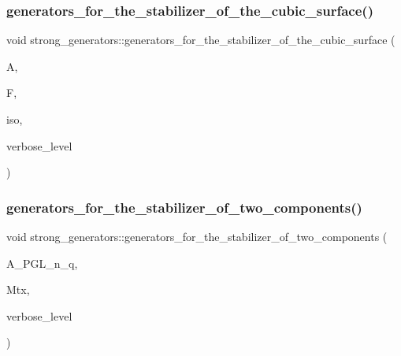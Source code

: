 \mbox{\label{classstrong__generators_a606282c1c7c6d98a03ad1f896d9ae4c0}} 
\subsubsection{\texorpdfstring{generators\+\_\+for\+\_\+the\+\_\+stabilizer\+\_\+of\+\_\+the\+\_\+cubic\+\_\+surface()}{generators\_for\_the\_stabilizer\_of\_the\_cubic\_surface()}}
{\footnotesize\ttfamily void strong\+\_\+generators\+::generators\+\_\+for\+\_\+the\+\_\+stabilizer\+\_\+of\+\_\+the\+\_\+cubic\+\_\+surface (\begin{DoxyParamCaption}\item[{\mbox{\hyperlink{classaction}{action}} $\ast$}]{A,  }\item[{\mbox{\hyperlink{classfinite__field}{finite\+\_\+field}} $\ast$}]{F,  }\item[{\mbox{\hyperlink{galois_8h_a09fddde158a3a20bd2dcadb609de11dc}{I\+NT}}}]{iso,  }\item[{\mbox{\hyperlink{galois_8h_a09fddde158a3a20bd2dcadb609de11dc}{I\+NT}}}]{verbose\+\_\+level }\end{DoxyParamCaption})}

\mbox{\label{classstrong__generators_acd9ddc5b768e4cf3f2398383d5a8f3b2}} 
\subsubsection{\texorpdfstring{generators\+\_\+for\+\_\+the\+\_\+stabilizer\+\_\+of\+\_\+two\+\_\+components()}{generators\_for\_the\_stabilizer\_of\_two\_components()}}
{\footnotesize\ttfamily void strong\+\_\+generators\+::generators\+\_\+for\+\_\+the\+\_\+stabilizer\+\_\+of\+\_\+two\+\_\+components (\begin{DoxyParamCaption}\item[{\mbox{\hyperlink{classaction}{action}} $\ast$}]{A\+\_\+\+P\+G\+L\+\_\+n\+\_\+q,  }\item[{\mbox{\hyperlink{classmatrix__group}{matrix\+\_\+group}} $\ast$}]{Mtx,  }\item[{\mbox{\hyperlink{galois_8h_a09fddde158a3a20bd2dcadb609de11dc}{I\+NT}}}]{verbose\+\_\+level }\end{DoxyParamCaption})}

